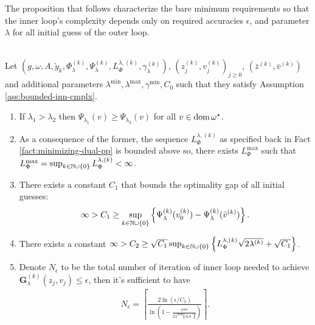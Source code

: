 \documentclass[12pt]{article}
\begin{document}
        \par
        The proposition that follows characterize the bare minimum requirements so that the inner loop's complexity depends only on required accuracies $\epsilon$, and parameter $\lambda$ for all initial guess of the outer loop. 
        \begin{proposition}\;\label{prop:inner-lp-cmplx}\\
            Let $\left(g, \omega, A, \tilde y_k, \Phi_\lambda^{(k)}, \Psi_\lambda^{(k)}, L^{\lambda, (k)}_{\Phi} ,\gamma_\lambda^{(k)}\right)$, $\left(z_j^{(k)}, v_{j}^{(k)}\right)_{j \ge 0}$, $\left(\bar z^{(k)}, \bar v^{(k)}\right)$ and additional parameters $\lambda^{\min}, \lambda^{\max}, \gamma^{\min}, C_0$ such that they satisfy Assumption \ref{ass:bounded-inn-cmplx}. 
            \begin{enumerate}[nosep]
                \item\label{prop:inner-lp-cmplx-result1} 
                If $\lambda_1 > \lambda_2$ then $\Psi_{\lambda_1}(v) \ge \Psi_{\lambda_2}(v)$ for all $v \in \operatorname{dom} \omega^\star$. 
                \item\label{prop:inner-lp-cmplx-result2}  As a consequence of the former, the sequence $L_\Phi^{\lambda, (k)}$ as specified back in Fact \ref{fact:minimizing-dual-pp} is bounded above so, there exists $L_\Phi^{\max}$ such that $L_\Phi^{\max} = \sup_{k \in \mathbb N \cup \{0\}}L_\Phi^{\lambda, (k)} < \infty$. 
                \item\label{prop:inner-lp-cmplx-result3} There exists a constant $C_1$ that bounds the optimality gap of all initial guesses: 
                \begin{align*}
                    \infty > C_1 \ge  \sup_{k \in \mathbb N \cup \{0\}}
                    \left\lbrace
                        \Psi_{\lambda}^{(k)}(v^{(k)}_0) - \Psi_\lambda^{(k)}(\bar v^{(k)})
                    \right\rbrace. 
                \end{align*}
                \item\label{prop:inner-lp-cmplx-result4} 
                There exists a constant $\infty > C_2 \ge \sqrt{C_1}\sup_{k \in \mathbb N \cup \{0\}}\left\lbrace L_\Phi^{\lambda, (k)}\sqrt{2\lambda^{(k)}} + \sqrt{C_1}\right\rbrace$. 
                \item\label{prop:inner-lp-cmplx-result5} 
                Denote $N_\epsilon$ to be the total number of iteration of inner loop needed to achieve $\mathbf G_\lambda^{(k)}(z_j, v_j) \le \epsilon$, then it's sufficient to have 
                \begin{align*}
                    N_{\epsilon} = \left\lceil 
                        \frac{2\ln(\epsilon/C_2)}{
                            \ln\left(
                                1 - \frac{\gamma^{\min}}{2\lambda^{\max}\left\Vert AA^\top\right\Vert}
                            \right)
                        }
                    \right\rceil. 
                \end{align*}
            \end{enumerate}

        \end{proposition}
\end{document}
